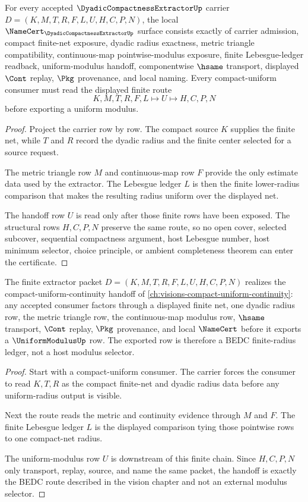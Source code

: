 \begin{theorem}
\label{thm:dyadic-compactness-extractor-namecert-obligations}
For every accepted $\DyadicCompactnessExtractorUp$ carrier $D=(K,M,T,R,F,L,U,H,C,P,N)$, the local $\NameCert_{\DyadicCompactnessExtractorUp}$ surface consists exactly of carrier admission, compact finite-net exposure, dyadic radius exactness, metric triangle compatibility, continuous-map pointwise-modulus exposure, finite Lebesgue-ledger readback, uniform-modulus handoff, componentwise $\hsame$ transport, displayed $\Cont$ replay, $\Pkg$ provenance, and local naming. Every compact-uniform consumer must read the displayed finite route
$$
K,M,T,R,F,L \longmapsto U \longmapsto H,C,P,N
$$
before exporting a uniform modulus.
\end{theorem}
\begin{proof}
Project the carrier row by row. The compact source $K$ supplies the finite net, while $T$ and $R$ record the dyadic radius and the finite center selected for a source request.

The metric triangle row $M$ and continuous-map row $F$ provide the only estimate data used by the extractor. The Lebesgue ledger $L$ is then the finite lower-radius comparison that makes the resulting radius uniform over the displayed net.

The handoff row $U$ is read only after those finite rows have been exposed. The structural rows $H,C,P,N$ preserve the same route, so no open cover, selected subcover, sequential compactness argument, host Lebesgue number, host minimum selector, choice principle, or ambient completeness theorem can enter the certificate.
\end{proof}

\begin{theorem}
\label{thm:dyadic-compactness-extractor-vision-handoff}
The finite extractor packet $D=(K,M,T,R,F,L,U,H,C,P,N)$ realizes the compact-uniform-continuity handoff of \autoref{ch:visions-compact-uniform-continuity}: any accepted consumer factors through a displayed finite net, one dyadic radius row, the metric triangle row, the continuous-map modulus row, $\hsame$ transport, $\Cont$ replay, $\Pkg$ provenance, and local $\NameCert$ before it exports a $\UniformModulusUp$ row. The exported row is therefore a BEDC finite-radius ledger, not a host modulus selector.
\end{theorem}
\begin{proof}
Start with a compact-uniform consumer. The carrier forces the consumer to read $K,T,R$ as the compact finite-net and dyadic radius data before any uniform-radius output is visible.

Next the route reads the metric and continuity evidence through $M$ and $F$. The finite Lebesgue ledger $L$ is the displayed comparison tying those pointwise rows to one compact-net radius.

The uniform-modulus row $U$ is downstream of this finite chain. Since $H,C,P,N$ only transport, replay, source, and name the same packet, the handoff is exactly the BEDC route described in the vision chapter and not an external modulus selector.
\end{proof}

